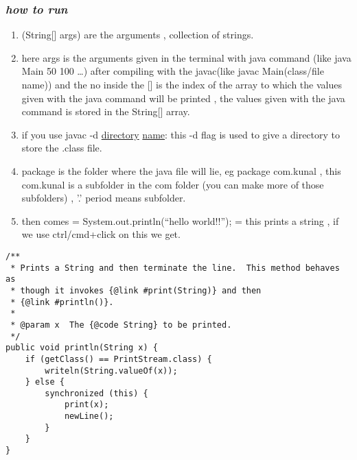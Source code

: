 \documentclass[11pt]{article}
\begin{document}
\subsubsection{\emph{how to run}}
\label{sec:org4fcd088}
\begin{enumerate}
\item (String[] args) are the arguments , collection of strings.
\item here args is the arguments given in the terminal with java command (like java Main 50 100 \ldots{}) after compiling with the javac(like javac Main(class/file name)) and the no inside the [] is the index of the array to which the values given with the java command will be printed , the values given with the java command is stored in the String[] array.
\item if you use javac -d \uline{directory} \uline{name}: this -d flag is used to give a directory to store the .class file.
\item package is the folder where the java file will lie, eg package com.kunal , this com.kunal is a subfolder in the com folder (you can make more of those subfolders) , '.' period means subfolder.
\item then comes = System.out.println(``hello world!!''); = this prints a string , if we use ctrl/cmd+click on this we get.
\end{enumerate}
\begin{verbatim}
/**
 * Prints a String and then terminate the line.  This method behaves as
 * though it invokes {@link #print(String)} and then
 * {@link #println()}.
 *
 * @param x  The {@code String} to be printed.
 */
public void println(String x) {
    if (getClass() == PrintStream.class) {
        writeln(String.valueOf(x));
    } else {
        synchronized (this) {
            print(x);
            newLine();
        }
    }
}
\end{verbatim}
\end{document}

